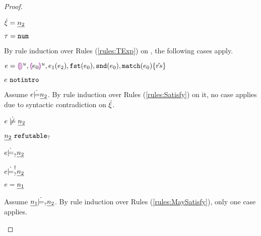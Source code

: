 \begin{proof}
\begin{byCases}
\item[\text{(\ref{rule:CTNum})}]
    \begin{pfsteps*}
    \item $\dot{\xi}=\underline{n_2}$ 
    \item $\tau=\mathtt{num}$ 
    \end{pfsteps*}
    By rule induction over Rules (\ref{rules:TExp}) on , the following cases apply.
    \begin{byCases}
    \item[\text{(\ref{rule:TEHole}),(\ref{rule:THole}),(\ref{rule:TAp}),(\ref{rule:TFst}),(\ref{rule:TSnd}),(\ref{rule:TMatchZPre}),(\ref{rule:TMatchNZPre})}]
        \begin{pfsteps*}
        \item $e=\textcolor{violet}{\llparenthesis}\textcolor{violet}{\rrparenthesis}^{u},\textcolor{violet}{\llparenthesis} e_0\textcolor{violet}{\rrparenthesis}^{u},e_1(e_2),\mathtt{fst}(e_0),\mathtt{snd}(e_0),\mathtt{match}(e_0) \{\hat{rs}\}$ 
        \item $e ~\mathtt{notintro}$  
        \end{pfsteps*}
        Assume $e \dot{\models} \underline{n_2}$. By rule induction over Rules (\ref{rules:Satisfy}) on it, no case applies due to syntactic contradiction on $\dot{\xi}$.\\
        \begin{pfsteps*}
        \item $\cnotsatisfy{e}{\cnum{n_2}}$ 
        \item $\underline{n_2} ~\mathtt{refutable}_?$  
        \item $e \dot{\models}_{?} \underline{n_2}$  
        \item $e \dot{\models}_{?}^{\dag} \underline{n_2}$  
        \end{pfsteps*}
    \item[\text{(\ref{rule:TNum})}]
        \begin{pfsteps*}
        \item $e=\underline{n_1}$ 
        \end{pfsteps*}
        Assume $\underline{n_1} \dot{\models}_{?} \underline{n_2}$. By rule induction over Rules (\ref{rules:MaySatisfy}), only one case applies.
        \begin{byCases}

\end{byCases}
\end{byCases}
\end{byCases}
\end{proof}
